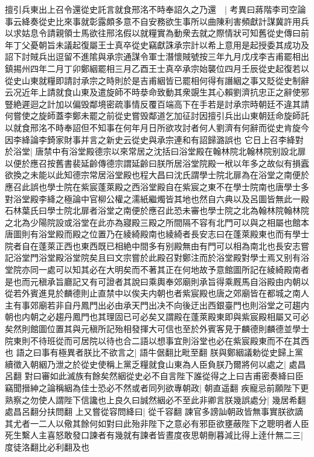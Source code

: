 擅引兵東出上召令還從史託言就食邢洺不時奉詔久之乃還　|{
	考異曰蔣階李司空論事云絳奏從史比來事就彰露頗多意不自安務欲生事所以曲陳利害頻獻計謀冀許用兵以求姑息令請親領士馬欲往邢洺假以就糧實為動衆去就之際情狀可知舊從史傳曰前年丁父憂朝旨未議起復屬王士真卒從史竊獻誅承宗計以希上意用是起授委其成功及詔下討賊兵出逗留不進隂與承宗通謀令軍士潛懷賊號按三年九月戊戌李吉甫罷相出鎮掦州四年二月丁卯鄭絪罷相三月乙酉王士真卒承宗始襲位四月壬辰從史起復若以從史山東就糧即請討承宗之時則於是吉甫絪皆已罷相何得有譖絪之事又貶從史制辭云况近年上請就食山東及遣旋師不時㳟命致動其衆覬生其心賴劉濟抗忠正之辭使邪豎絶遲迴之計加以偏毁鄰境密疏事情反覆百端高下在手若是討承宗時朝廷不違其請何嘗使之旋師蓋李鄭未罷之前從史嘗毁鄰道乞加征討因擅引兵出山東朝廷命旋師託以就食邢洺不時奉詔但不知事在何年月日所欲攻討者何人劉濟有何辭而從史肯旋今因李絳論李錡家財事并言之新史云從史與承宗連和有詔歸潞誤也}
它日上召李絳對於浴堂|{
	唐禁中有浴堂殿德宗以來常居之沈括曰浴堂殿在翰林院北翰林院别設北扉以便於應召按舊書裴延齡傳德宗謂延齡曰朕所居浴堂院殿一栿以年多之故似有損蠧欲換之未能以此知德宗常居浴堂殿也程大昌曰沈氏謂學士院北扉為在浴堂之南便於應召此誤也學士院在紫宸蓬萊殿之西浴堂殿自在紫宸之東不在學士院南也唐學士多對浴堂殿李絳之極論中官柳公權之濡紙繼燭皆其地也然自六典以及呂圖皆無此一殿石林葉氏曰學士院北扉者浴堂之南便於應召此恐未審也學士院之北為翰林院翰林院之北為少陽院設或浴堂在此亦為寢殿三殿之所間隔不容有北門可以與之相屬也館本唐圖則有浴堂殿而殿之位置乃在綾綺殿南也綾綺者長安志曰在蓬萊殿東也而有學士院者自在蓬萊正西也東西既已相絶中間多有别殿無由有門可以相為南北也長安志嘗記浴堂門浴堂殿浴堂院矣且曰文宗嘗於此殿召對鄭注而於浴堂殿對學士焉又别有浴堂院亦同一處可以知其必在大明矣而不著其正在何地故予意館圖所記在綾綺殿南者是也而元稹承旨廳記又有可證者其說曰乘輿奉郊廟則承旨得乘厩馬自浴殿由内朝以從若外賓進見於麟德則止直禁中以俟夫内朝也者紫宸殿也唐之郊廟皆在都城之南人主有事郊廟若非自丹鳳門出必由承天門出决不向後迂出西銀臺門也則浴堂之可趨内朝也内朝之必趨丹鳳門也其理固已可必矣又謂殿在蓬萊殿東即與紫宸殿相屬又可必矣然則館圖位置其與元稹所記殆相發揮大可信也至於外賓客見于麟德則麟德並學士院東則不待班從而可居院以待也合二語以想事宜則浴堂也必在紫宸殿東而不在其西也}
語之曰事有極異者朕比不欲言之|{
	語牛倨翻比毗至翻}
朕與鄭絪議勅從史歸上黨續徵入朝絪乃泄之於從史使稱上黨乏糧就食山東為人臣負朕乃爾將何以處之|{
	處昌呂翻}
對曰審如此滅族有餘矣然絪從史必不自言陛下誰從得之上曰吉甫密奏絳曰臣竊聞搢紳之論稱絪為佳士恐必不然或者同列欲專朝政|{
	朝直遥翻}
疾寵忌前願陛下更熟察之勿使人謂陛下信讒也上良久曰誠然絪必不至此非卿言朕幾誤處分|{
	幾居希翻處昌呂翻分扶問翻}
上又嘗從容問絳曰|{
	從千容翻}
諫官多謗訕朝政皆無事實朕欲謫其尤者一二人以儆其餘何如對曰此殆非陛下之意必有邪臣欲壅蔽陛下之聰明者人臣死生繫人主喜怒敢發口諫者有幾就有諫者皆晝度夜思朝刪暮減比得上逹什無二三|{
	度徒洛翻比必利翻及也}
